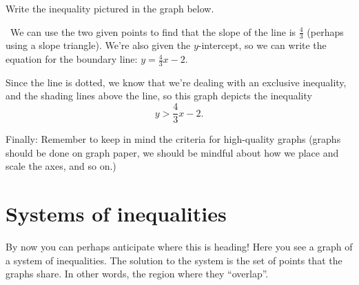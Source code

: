 \begin{boxex}
Write the inequality pictured in the graph below.

\begin{center}
\end{center}

\exsoln\ We can use the two given points to find that the slope of the line is $\frac{4}{3}$ (perhaps using a slope triangle). We're also given the $y$-intercept, so we can write the equation for the boundary line: $y=\frac{4}{3}x-2$.

Since the line is dotted, we know that we're dealing with an exclusive inequality, and the shading lines above the line, so this graph depicts the inequality \[y > \frac{4}{3}x-2.\]
\end{boxex}

Finally: Remember to keep in mind the criteria for high-quality graphs (graphs should be done on graph paper, we should be mindful about how we place and scale the axes, and so on.)

\section{Systems of inequalities}
\label{sec:ineqsystems}


By now you can perhaps anticipate where this is heading! Here you see a graph of a system of inequalities. The solution to the system is the set of points that the graphs share. In other words, the region where they ``overlap''.

\begin{center}
\end{center}

